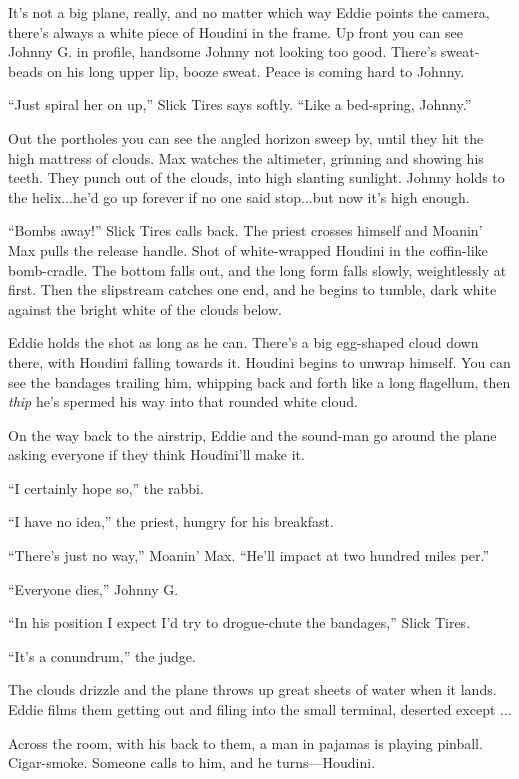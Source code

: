 It's not a big plane, really, and no matter which way Eddie points the camera, there's always a white piece of Houdini in the frame. Up front you can see Johnny G. in profile, handsome Johnny not looking too good. There's sweat-beads on his long upper lip, booze sweat. Peace is coming hard to Johnny.

``Just spiral her on up,'' Slick Tires says softly. ``Like a bed-spring, Johnny.''

Out the portholes you can see the angled horizon sweep by, until they hit the high mattress of clouds. Max watches the altimeter, grinning and showing his teeth. They punch out of the clouds, into high slanting sunlight. Johnny holds to the helix...he'd go up forever if no one said stop...but now it's high enough.

``Bombs away!'' Slick Tires calls back. The priest crosses himself and Moanin' Max pulls the release handle. Shot of white-wrapped Houdini in the coffin-like bomb-cradle. The bottom falls out, and the long form falls slowly, weightlessly at first. Then the slipstream catches one end, and he begins to tumble, dark white against the bright white of the clouds below.

Eddie holds the shot as long as he can. There's a big egg-shaped cloud down there, with Houdini falling towards it. Houdini begins to unwrap himself. You can see the bandages trailing him, whipping back and forth like a long flagellum, then \textit{thip} he's spermed his way into that rounded white cloud.

On the way back to the airstrip, Eddie and the sound-man go around the plane asking everyone if they think Houdini'll make it.

``I certainly hope so,'' the rabbi.

``I have no idea,'' the priest, hungry for his breakfast.

``There's just no way,'' Moanin' Max. ``He'll impact at two hundred miles per.''

``Everyone dies,'' Johnny G.

``In his position I expect I'd try to drogue-chute the bandages,'' Slick Tires.

``It's a conundrum,'' the judge.

The clouds drizzle and the plane throws up great sheets of water when it lands. Eddie films them getting out and filing into the small terminal, deserted except ...

Across the room, with his back to them, a man in pajamas is playing pinball. Cigar-smoke. Someone calls to him, and he turns—Houdini.

